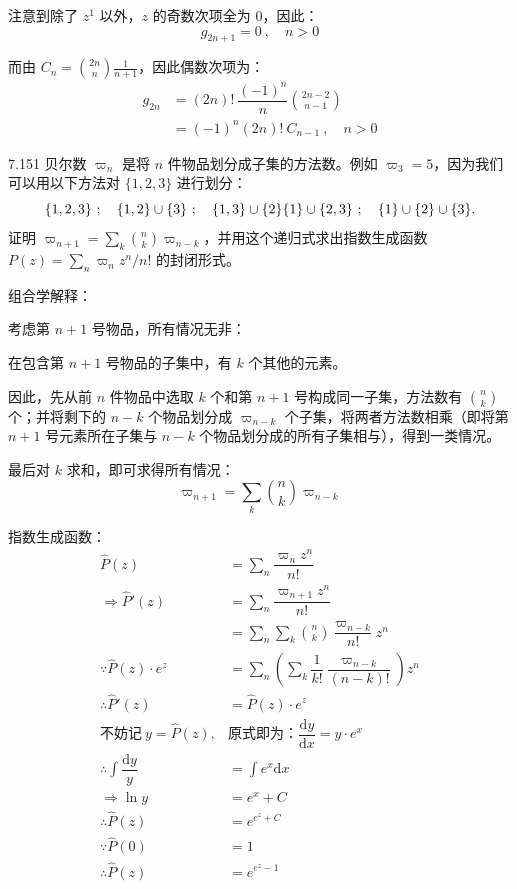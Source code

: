 注意到除了 \( z^1 \) 以外，\( z \) 的奇数次项全为 \( 0 \)，因此：
\[
  g_{2n+1} = 0 \ , \quad n > 0
\]

而由 \( C_n = \displaystyle \binom{2n}{n} \frac{1}{n+1} \)，因此偶数次项为：
\begin{align*}
  g_{2n} &= (2n)! \ \dfrac{(-1)^n}{n} \binom{2n-2}{n-1} \\
  &= (-1)^n (2n)! \ C_{n-1} \ , \quad n > 0
\end{align*}

\begin{problem}{7.15}{1}
  贝尔数 \( \varpi_n \) 是将 \( n \) 件物品划分成子集的方法数。例如 \( \varpi_3 = 5 \)，因为我们可以用以下方法对 \( \{ 1, 2, 3 \} \) 进行划分：
  \[
    \{ 1, 2, 3 \} \ ; \quad \{ 1, 2 \} \cup \{ 3 \} \ ; \quad \{ 1, 3 \} \cup \{ 2 \} \\
    \{ 1 \} \cup \{ 2, 3 \} \ ; \quad \{ 1 \} \cup \{ 2 \} \cup \{ 3 \} .
  \]
  证明 \( \varpi_{n+1} = \sum_k \binom{n}{k} \varpi_{n-k} \)，并用这个递归式求出指数生成函数 \( P(z) = \sum_n \varpi_n z^n / n! \) 的封闭形式。
\end{problem}

组合学解释：

考虑第 \( n+1 \) 号物品，所有情况无非：

在包含第 \( n+1 \) 号物品的子集中，有 \( k \) 个其他的元素。

因此，先从前 \( n \) 件物品中选取 \( k \) 个和第 \( n+1 \) 号构成同一子集，方法数有 \( \displaystyle\binom{n}{k} \) 个；并将剩下的 \( n-k \) 个物品划分成 \( \varpi_{n-k} \) 个子集，将两者方法数相乘（即将第 \( n+1 \) 号元素所在子集与 \( n-k \) 个物品划分成的所有子集相与），得到一类情况。

最后对 \( k \) 求和，即可求得所有情况：
\[
  \varpi_{n+1} = \sum_k \binom{n}{k} \varpi_{n-k}
\]

指数生成函数：
\begin{align*}
  \hat{P}(z) &= \sum_n \dfrac{\varpi_n z^n}{n!} \\
  \Rightarrow \hat{P}'(z) &= \sum_n \dfrac{\varpi_{n+1} z^{n}}{n!} \\
  &= \sum_n \sum_k \binom{n}{k} \dfrac{\varpi_{n-k}}{n!} z^n \\
  \because \hat{P}(z) \cdot e^z &= \sum_n \left( \sum_k \dfrac{1}{k!} \dfrac{\varpi_{n-k}}{(n-k)!} \right) z^n \\
  \therefore \hat{P}'(z) &= \hat{P}(z) \cdot e^z \\
  \text{不妨记} \ y = \hat{P}(z) , & \text{原式即为：} \dfrac{\mathrm{d}y}{\mathrm{d}x} = y \cdot e^x \\
  \therefore \int \dfrac{\mathrm{d}y}{y} &= \int e^x \mathrm{d} x \\
  \Rightarrow \ln{y} &= e^x + C \\
  \therefore \hat{P}(z) &= e^{e^z + C} \\[6pt]
  \because \hat{P}(0) &= 1 \\
  \therefore \hat{P}(z) &= e^{e^z - 1}
\end{align*}

